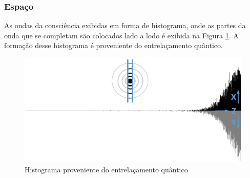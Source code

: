 \subsubsection{Espaço}
As ondas da consciência exibidas em forma de histograma, onde as partes da onda que se completam são colocados lado a lodo é exibida na Figura \ref{fig:consciousness_space_waves}. A formação desse histograma é proveniente do entrelaçamento quântico.
\begin{figure}[H]
\caption{Histograma proveniente do entrelaçamento quântico}
\label{fig:consciousness_space_waves}
\centering
\includegraphics[scale=.7]{sections/images/consciousness_space_waves.jpg}
\end{figure}

